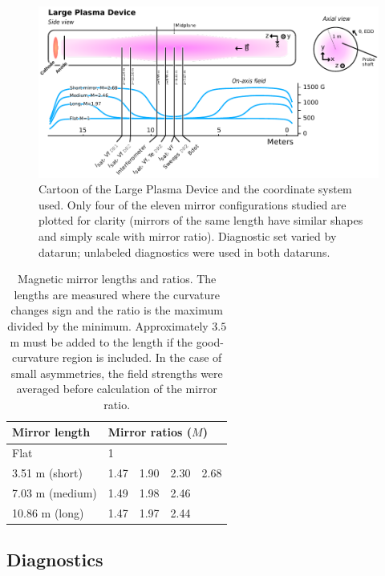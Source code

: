 \begin{figure}
    \centering
    \includegraphics[width=\textwidth]{figures/fig1.pdf}
    \caption{Cartoon of the Large Plasma Device and the coordinate system used. Only four of the eleven mirror configurations studied are plotted for clarity (mirrors of the same length have similar shapes and simply scale with mirror ratio). Diagnostic set varied by datarun; unlabeled diagnostics were used in both dataruns.}
    \label{fig:magnetic_geometry}
\end{figure}

\begin{table}
 \centering
 \begin{tabular}{l l l l l}
 Mirror length & \multicolumn{4}{l}{Mirror ratios ($M$)} \\
 \hline
 Flat & 1 & & & \\
  3.51 m (short) & 1.47 & 1.90 & 2.30 & 2.68 \\ 
 7.03 m (medium) & 1.49 & 1.98 & 2.46 & \\
 10.86 m (long) & 1.47 & 1.97 & 2.44 & \\
 \end{tabular}
\caption{\label{tab:fields}Magnetic mirror lengths and ratios. The lengths are measured where the curvature changes sign and the ratio is the maximum divided by the minimum. Approximately $3.5$m must be added to the length if the good-curvature region is included. In the case of small asymmetries, the field strengths were averaged before calculation of the mirror ratio.}
\end{table}

\subsection{\label{sec:sub_diagnostics}Diagnostics}

